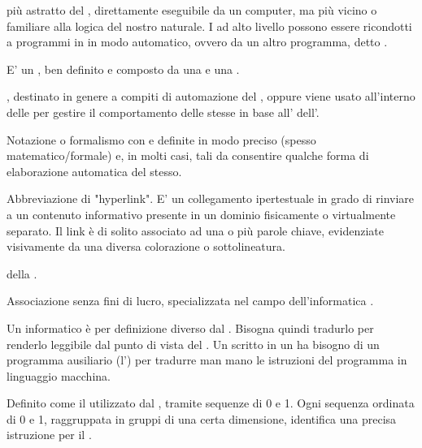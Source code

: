 { più astratto del , direttamente eseguibile da un computer, ma più vicino o familiare alla logica del nostro  naturale. I  ad alto livello possono essere ricondotti a programmi in  in modo automatico, ovvero da un altro programma, detto .}


{E' un , ben definito e composto da una  e una .}


{, destinato in genere a compiti di automazione del , oppure viene usato all'interno delle  per gestire il comportamento delle  stesse in base all'  dell'.}


{Notazione o formalismo con  e  definite in modo preciso (spesso matematico/formale) e, in molti casi, tali da consentire qualche forma di elaborazione automatica del  stesso.}


{Abbreviazione di "hyperlink". E' un collegamento ipertestuale in grado di rinviare a un contenuto informativo presente in un dominio fisicamente o virtualmente separato. Il link è di solito associato ad una o più parole chiave, evidenziate visivamente da una diversa colorazione o sottolineatura.}


{ della .}


{Associazione senza fini di lucro, specializzata nel campo dell'informatica .}


{Un  informatico è per definizione diverso dal . Bisogna quindi tradurlo per renderlo leggibile dal punto di vista del . Un  scritto in un  ha bisogno di un programma ausiliario (l') per tradurre man mano le istruzioni del programma in linguaggio macchina.}


{Definito come il  utilizzato dal , tramite sequenze di 0 e 1. Ogni sequenza ordinata di 0 e 1, raggruppata in gruppi di una certa dimensione, identifica una precisa istruzione per il .}


